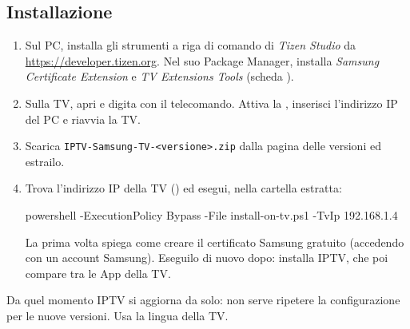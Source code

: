 \subsection{Installazione}
\begin{enumerate}
  \item Sul PC, installa gli strumenti a riga di comando di \emph{Tizen
        Studio} da \url{https://developer.tizen.org}. Nel suo Package Manager,
        installa \emph{Samsung Certificate Extension} e \emph{TV Extensions
        Tools} (scheda ).
  \item Sulla TV, apri  e digita 
        con il telecomando. Attiva la , inserisci
        l'indirizzo IP del PC e riavvia la TV.
  \item Scarica \texttt{IPTV-Samsung-TV-\textless versione\textgreater.zip}
        dalla pagina delle versioni ed estrailo.
  \item Trova l'indirizzo IP della TV () ed
        esegui, nella cartella estratta:
\begin{center}
\begin{minipage}{0.92\linewidth}
\small\ttfamily powershell -ExecutionPolicy Bypass -File install-on-tv.ps1 -TvIp 192.168.1.4
\end{minipage}
\end{center}
        La prima volta spiega come creare il certificato Samsung gratuito
        (accedendo con un account Samsung). Eseguilo di nuovo dopo: installa
        IPTV, che poi compare tra le App della TV.
\end{enumerate}
Da quel momento IPTV si aggiorna da solo: non serve ripetere la
configurazione per le nuove versioni. Usa la lingua della TV.

